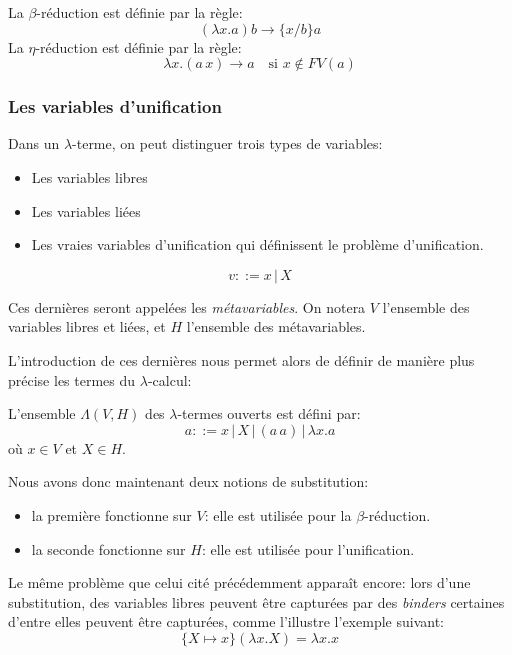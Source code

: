 \begin{defn}
La $\beta$-réduction est définie par la règle:
\[(\lambda x.a)b \xrightarrow{} \{x/b\}a\]
La $\eta$-réduction est définie par la règle:
\[\lambda x.(a \, x) \xrightarrow{} a \quad \text{si } x \notin FV(a) \]
\end{defn}

\subsubsection{Les variables d’unification}

Dans un $\lambda$-terme, on peut distinguer trois types de variables:
\begin{itemize}
    \item Les variables libres
    \item Les variables liées
    \item Les vraies variables d’unification qui définissent le problème d’unification.
\end{itemize}

\[ v::= x \, | \, X \]

Ces dernières seront appelées les \textit{métavariables}. On notera $V$ l'ensemble des variables libres et liées, et $H$ l'ensemble des métavariables.

L'introduction de ces dernières nous permet alors de définir de manière plus précise les termes du $\lambda$-calcul:

\begin{defn}
L'ensemble $\Lambda(V,H)$ des $\lambda$-termes ouverts est défini par:
\[ a ::= x \,|\, X \,|\, (a \, a) \,| \,\lambda x. a\]
où $x \in V$ et $X \in H$.\\
\end{defn}

Nous avons donc maintenant deux notions de substitution:
\begin{itemize}
    \item la première fonctionne sur $V$: elle est utilisée pour la $\beta$-réduction.
    \item la seconde fonctionne sur $H$: elle est utilisée pour l'unification.
\end{itemize}

Le même problème que celui cité précédemment apparaît encore: lors d'une substitution, des variables libres peuvent être capturées par des \textit{binders} certaines d'entre elles peuvent être capturées, comme l'illustre l'exemple suivant:
\[\{ X \mapsto x \}(\lambda x . X) = \lambda x . x\]

